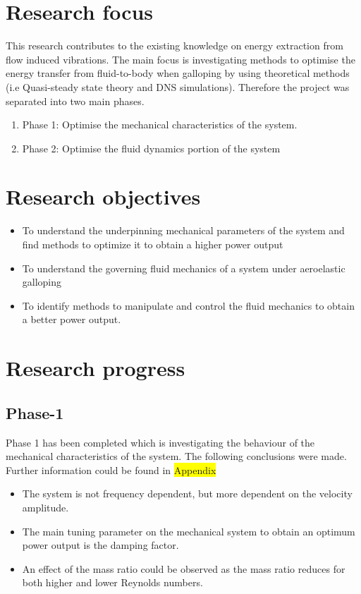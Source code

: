 \documentclass{article}
\newcommand{\hilight}[1]{\colorbox{yellow}{#1}}
\begin{document}
\section{Research focus}
 This research contributes to the existing knowledge on energy extraction from flow induced vibrations. The main focus is investigating methods to optimise the energy transfer from fluid-to-body when galloping by using theoretical methods (i.e Quasi-steady state theory and DNS simulations). Therefore the project was separated into two main phases.
 
\begin{enumerate}[]
\item Phase 1: Optimise the mechanical characteristics of the system.
\item Phase 2: Optimise the fluid dynamics portion of the system 
\end{enumerate}

\section{Research objectives}

\begin{itemize}
\item To understand the underpinning mechanical parameters of the system and find methods to optimize it to obtain a higher power output 
\item To understand the governing fluid mechanics of a system under aeroelastic galloping 
\item To identify methods to manipulate and control the fluid mechanics to obtain a better power output.  
\end{itemize}




\section{Research progress}

\subsection{Phase-1}

Phase 1 has been completed which is investigating the behaviour of the mechanical characteristics of the system. The following conclusions were made. Further information could be found in \hilight{Appendix}

\begin{itemize}
\item   The system is not frequency dependent, but more dependent on the velocity amplitude.
\item The main tuning parameter on the mechanical system to obtain an optimum power output is the damping factor.
\item An effect of the mass ratio could be observed as the mass ratio reduces for both higher and lower Reynolds numbers. 
\end{itemize}
\end{document}
